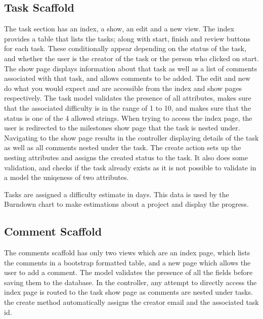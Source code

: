 \documentclass[a4wide, 11pt]{article}
\begin{document}
\subsection{Task Scaffold}
The task section has an index, a show, an edit and a new view. The index provides a table that lists the tasks; along with start, finish and review buttons for each task. These conditionally appear depending on the status of the task, and whether the user is the creator of the task or the person who clicked on start. The show page displays information about that task as well as a list of comments associated with that task, and allows comments to be added. The edit and new do what you would expect and are accessible from the index and show pages respectively. The task model validates the presence of all attributes, makes sure that the associated difficulty is in the range of 1 to 10, and makes sure that the status is one of the 4 allowed strings. When trying to access the index page, the user is redirected to the milestones show page that the task is nested under. Navigating to the show page results in the controller displaying details of the task as well as all comments nested under the task. The create action sets up the nesting attributes and assigns the created status to the task. It also does some validation, and checks if the task already exists as it is not possible to validate in a model the uniqeness of two attributes. 

Tasks are assigned a difficulty estimate in days. This data is used by the Burndown chart to make estimations about a project and display the progress.

\subsection{Comment Scaffold}
The comments scaffold has only two views which are an index page, which lists the comments in a bootstrap formatted table, and a new page which allows the user to add a comment. The model validates the presence of all the fields before saving them to the database. In the controller, any attempt to directly access the index page is routed to the task show page as comments are nested under tasks. the create method automatically assigns the creator email and the associated task id.
\end{document}

